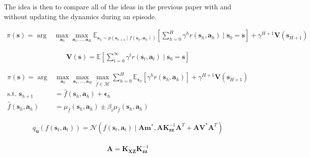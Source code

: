 \documentclass{article}
\newcommand{\state}{\ensuremath{\mathbf{s}}}
\newcommand{\action}{\ensuremath{\mathbf{a}}}
\newcommand{\noise}{\ensuremath{\bm\epsilon}}
\newcommand{\discount}{\ensuremath{\gamma}}
\newcommand{\inducingVariable}{\ensuremath{\mathbf{u}}}
\newcommand{\horizon}{\ensuremath{h}}
\newcommand{\Horizon}{\ensuremath{H}}
\newcommand{\rewardFn}{\ensuremath{r}}
\newcommand{\transitionFn}{\ensuremath{f}}
\newcommand{\optimisticTransition}{\ensuremath{\hat{f}}}
\newcommand{\optimisticTransitionMean}{\ensuremath{\mu_{\optimisticTransition}}}
\newcommand{\optimisticTransitionCov}{\ensuremath{\mu_{\optimisticTransition}}}
\newcommand{\optimisticTransitionSet}{\ensuremath{\mathcal{M}}}
\newcommand{\stateValueFn}{\ensuremath{\mathbf{V}}}
\newcommand{\policy}{\ensuremath{\pi}}
\begin{document}
The idea is then to compare all of the ideas in the previous paper with and without updating the dynamics during an episode.

\begin{align} \label{eq-fast-update-mpc}
  \policy(\state) = \arg &\max_{\action_{0}} \max_{\action_{1}, \ldots, \action_{\Horizon}}
  \mathbb{E}_{\state_{\horizon} \sim p(\state_{\horizon+1} \mid \transitionFn(\state_{\horizon}, \action_{\horizon}))} \left[ \sum_{\horizon=0}^{\Horizon}     \discount^{\horizon} \rewardFn(\state_{\horizon},\action_{\horizon}) \mid \state_{0}=\state \right] + \discount^{\Horizon+1} \stateValueFn(\state_{\Horizon+1})
\end{align}

\begin{align} \label{eq-fast-update-mpc}
  \stateValueFn(\state) = \mathbb{E} \left[ \sum_{t=0}^{\infty}     \discount^{t} \rewardFn(\state_{t},\action_{t}) \mid \state_{0}=\state \right]
\end{align}

\begin{align} \label{eq-fast-update-mpc}
  \policy(\state) = \arg &\max_{\action_{0}} \max_{\action_{1}, \ldots, \action_{\Horizon}} \max_{\optimisticTransition \in \optimisticTransitionSet}
  \sum_{\horizon=0}^{\Horizon}  \mathbb{E}_{\noise_{\horizon}} \left[  \discount^{\horizon} \rewardFn(\state_{\horizon},\action_{\horizon}) \right] + \discount^{\Horizon+1} \stateValueFn(\state_{\Horizon+1}) \\
  \text{s.t. } \state_{\horizon+1} &= \optimisticTransition(\state_{\horizon}, \action_{\horizon}) + \noise_{\horizon} \\
  \optimisticTransition(\state_{\horizon}, \action_{\horizon}) &=
\optimisticTransitionMean(\state_{\horizon}, \action_{\horizon}) \pm \beta_{i}
\optimisticTransitionCov(\state_{\horizon}, \action_{\horizon})
\end{align}

\begin{align} \label{eq-svgp-predictive-posterior}
  q_{\inducingVariable}(\transitionFn(\state_{t}, \action_{t})) = \mathcal{N}
  \left( \transitionFn(\state_{t}, \action_{t}) \mid \mathbf{A} \mathbf{m}^{*}, \mathbf{A}\mathbf{K}_{\mathbf{z}\mathbf{z}}^{-1} \mathbf{A}^{T} + \mathbf{A} \mathbf{V}^{*} \mathbf{A}^{T} \right)
\end{align}

\begin{align} \label{eq-matrix-A}
  \mathbf{A} = \mathbf{K}_{\mathbf{X}\mathbf{Z}} \mathbf{K}^{-1}_{\mathbf{z}\mathbf{z}}
\end{align}
\end{document}
